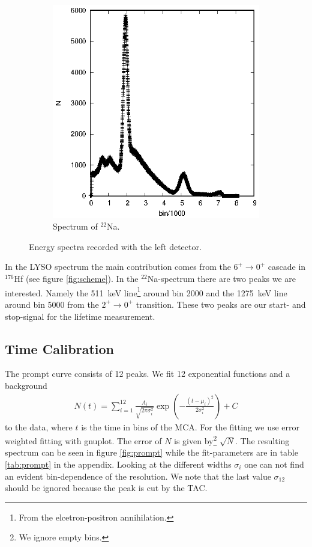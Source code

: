 \begin{figure}[h]
\begin{subfigure}[h]{0.49\textwidth}
    \includegraphics[width=\textwidth]{evaluation_kilian/energy_spectra/links_Na.eps}
    \caption{Spectrum of $^{22}$Na.}
  \end{subfigure}
  \caption{Energy spectra recorded with the left detector.}
  \label{fig:energy_spectra}
\end{figure}

In the LYSO spectrum the main contribution comes from the $6^+ \rightarrow 0^+$ cascade in $^{176}$Hf (see figure \ref{fig:scheme}). In the $^{22}$Na-spectrum there are two peaks we are interested. Namely the \SI{511}{\kilo\electronvolt} line\footnote{From the elcetron-positron annihilation.} around bin 2000 and the \SI{1275}{\kilo\electronvolt} line around bin 5000 from the $2^+ \rightarrow 0^+$ transition. These two peaks are our start- and stop-signal for the lifetime measurement.

\subsection{Time Calibration}
The prompt curve consists of 12 peaks. We fit 12 exponential functions and a background
\begin{align*}
  N(t)=\sum_{i=1}^{12}\frac{A_i}{\sqrt{2\pi\sigma_i^2}}\exp \left( -\frac{(t-\mu_i)^2}{2\sigma_i^2}\right)+C
\end{align*}
to the data, where $t$ is the time in bins of the MCA. For the fitting we use error weighted fitting with gnuplot. The error of $N$ is given by\footnote{We ignore empty bins.} $\sqrt{N}$. The resulting spectrum can be seen in figure \ref{fig:prompt} while the fit-parameters are in table \ref{tab:prompt} in the appendix. Looking at the different widths $\sigma_i$ one can not find an evident bin-dependence of the resolution. We note that the last value $\sigma_{12}$ should be ignored because the peak is cut by the TAC.

